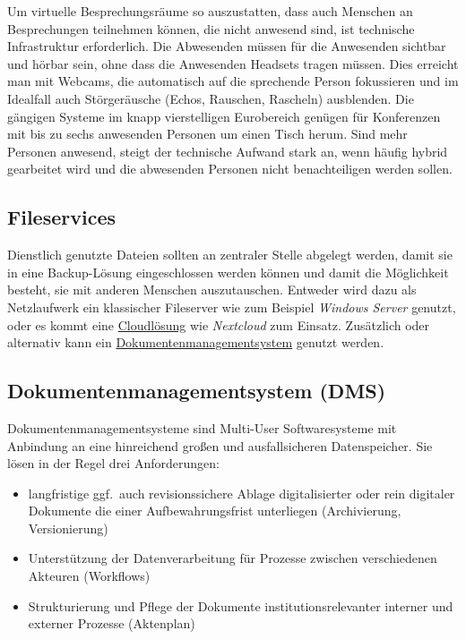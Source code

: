 \documentclass[
  11pt,
  letterpaper,
  DIV=11,
  twoside]{scrreprt}
\begin{document}
Um virtuelle Besprechungsräume so auszustatten, dass auch Menschen an
Besprechungen teilnehmen können, die nicht anwesend sind, ist technische
Infrastruktur erforderlich. Die Abwesenden müssen für die Anwesenden
sichtbar und hörbar sein, ohne dass die Anwesenden Headsets tragen
müssen. Dies erreicht man mit Webcams, die automatisch auf die
sprechende Person fokussieren und im Idealfall auch Störgeräusche
(Echos, Rauschen, Rascheln) ausblenden. Die gängigen Systeme im knapp
vierstelligen Eurobereich genügen für Konferenzen mit bis zu sechs
anwesenden Personen um einen Tisch herum. Sind mehr Personen anwesend,
steigt der technische Aufwand stark an, wenn häufig hybrid gearbeitet
wird und die abwesenden Personen nicht benachteiligen werden sollen.

\subsection{Fileservices}\label{fileservices}

Dienstlich genutzte Dateien sollten an zentraler Stelle abgelegt werden,
damit sie in eine Backup-Lösung eingeschlossen werden können und damit
die Möglichkeit besteht, sie mit anderen Menschen auszutauschen.
Entweder wird dazu als Netzlaufwerk ein klassischer Fileserver wie zum
Beispiel \emph{Windows Server} genutzt, oder es kommt eine
\hyperref[echtzeit-kollaboration]{Cloudlösung} wie \emph{Nextcloud} zum
Einsatz. Zusätzlich oder alternativ kann ein
\hyperref[dokumentenmanagementsysteme]{Dokumentenmanagementsystem}
genutzt werden.

\subsection{Dokumentenmanagementsystem
(DMS)}\label{dokumentenmanagementsysteme}

Dokumentenmanagementsysteme sind Multi-User Softwaresysteme mit
Anbindung an eine hinreichend großen und ausfallsicheren Datenspeicher.
Sie lösen in der Regel drei Anforderungen:

\begin{itemize}
\item
  langfristige ggf.~auch revisionssichere Ablage digitalisierter oder
  rein digitaler Dokumente die einer Aufbewahrungsfrist unterliegen
  (Archivierung, Versionierung)
\item
  Unterstützung der Datenverarbeitung für Prozesse zwischen
  verschiedenen Akteuren (Workflows)
\item
  Strukturierung und Pflege der Dokumente institutionsrelevanter
  interner und externer Prozesse (Aktenplan)
\end{itemize}
\end{document}
